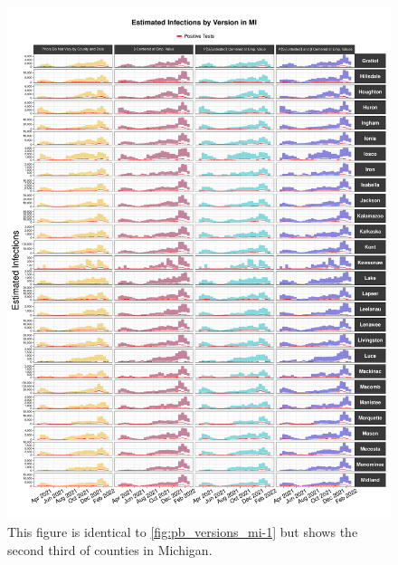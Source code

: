 \documentclass[12pt,twoside]{smiththesis}
\begin{document}
\begin{figure}

{\centering \includegraphics[width=1\linewidth]{figure/mi2_pb_compared_to_observed} 

}

\caption{\label{fig:pb_versions_mi-2} This figure is identical to \ref{fig:pb_versions_mi-1} but shows the second third of counties in Michigan.}\label{fig:unnamed-chunk-113}
\end{figure}
\end{document}
